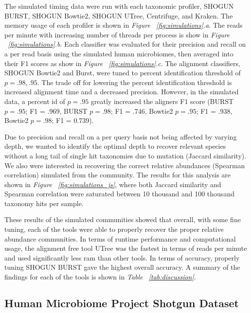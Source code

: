 The simulated timing data were run with each taxonomic profiler, SHOGUN BURST, SHOGUN Bowtie2, SHOGUN UTree, Centrifuge, and Kraken. The memory usage of each profiler is shown in \textit{Figure ~\ref{fig:simulations}.a}. The reads per minute with increasing number of threads per process is show in \textit{Figure ~\ref{fig:simulations}.b}. Each classifier was evaluated for their precision and recall on a per read basis using the simulated human microbiomes, then averaged into their F1 scores as show in \textit{Figure ~\ref{fig:simulations}.c}. The alignment classifiers, SHOGUN Bowtie2 and Burst, were tuned to percent identification threshold of $p=.98, .95$. The trade off for lowering the percent identification threshold is increased alignment time and a decreased precision. However, in the simulated data, a percent id of $p=.95$ greatly increased the aligners F1 score (BURST $p = .95$; F1 = .969, BURST $p = .98$; F1 = .746, Bowtie2 $p = .95$; F1 = .938, Bowtie2 $p = .98$; F1 = 0.739).

Due to precision and recall on a per query basis not being affected by varying depth, we wanted to identify the optimal depth to recover relevant species without a long tail of single hit taxonomies due to mutation (Jaccard similarity). We also were interested in recovering the correct relative abundances (Spearman correlation) simulated from the community. The results for this analysis are shown in \textit{Figure ~\ref{fig:simulations_js}}, where both Jaccard similarity and Spearman correlation were saturated between 10 thousand and 100 thousand taxonomy hits per sample.

These results of the simulated communities showed that overall, with some fine tuning, each of the tools were able to properly recover the proper relative abundance communities. In terms of runtime performance and computational usage, the alignment free tool UTree was the fastest in terms of reads per minute and used significantly less ram than other tools. In terms of accuracy, properly tuning SHOGUN BURST gave the highest overall accuracy. A summary of the findings for each of the tools is shown in \textit{Table ~\ref{tab:discussion}}.

\subsection{Human Microbiome Project Shotgun Dataset}


